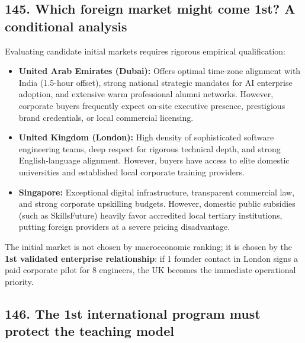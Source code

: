 \subsection{145. Which foreign market might come 1st? A conditional analysis}

Evaluating candidate initial markets requires rigorous empirical qualification:
\begin{itemize}
    \item \textbf{United Arab Emirates (Dubai):} Offers optimal time-zone alignment with India (1.5-hour offset), strong national strategic mandates for AI enterprise adoption, and extensive warm professional alumni networks. However, corporate buyers frequently expect on-site executive presence, prestigious brand credentials, or local commercial licensing.
    \item \textbf{United Kingdom (London):} High density of sophisticated software engineering teams, deep respect for rigorous technical depth, and strong English-language alignment. However, buyers have access to elite domestic universities and established local corporate training providers.
    \item \textbf{Singapore:} Exceptional digital infrastructure, transparent commercial law, and strong corporate upskilling budgets. However, domestic public subsidies (such as SkillsFuture) heavily favor accredited local tertiary institutions, putting foreign providers at a severe pricing disadvantage.
\end{itemize}
The initial market is not chosen by macroeconomic ranking; it is chosen by the \textbf{1st validated enterprise relationship}: if 1 founder contact in London signs a paid corporate pilot for 8 engineers, the UK becomes the immediate operational priority.

\subsection{146. The 1st international program must protect the teaching model}

